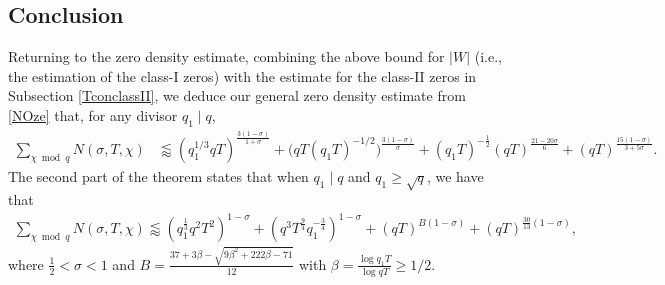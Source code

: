 \documentclass[12pt]{amsart}
\theoremstyle{definition}
\theoremstyle{plain}
\theoremstyle{remark}
\numberwithin{equation}{section}
\numberwithin{theorem}{section}
\numberwithin{equation}{section}
\begin{document}
	\subsection{Conclusion}\label{conclu}
	Returning to the zero density estimate, combining the above bound for $|W|$ (i.e., the estimation of the class-I zeros)
	with the estimate for the class-II zeros in Subsection \ref{TconclassII}, we
	deduce our general zero density estimate from \eqref{NOze} that, for any divisor $q_1\mid q$,
	\begin{align*}
		\sum_{\chi \bmod q} N(\sigma,T,\chi)
		&\lessapprox
		(q_1^{1/3}qT)^{\frac{3(1-\sigma)}{1+\sigma}}
		+
		\bigl(qT(q_1T)^{-1/2}\bigr)^{\frac{3(1-\sigma)}{\sigma}}+
		(q_1T)^{-\frac{1}{2}}(qT)^{\frac{21-20\sigma}{6}}
		+
		(qT)^{\frac{15(1-\sigma)}{3+5\sigma}}.
	\end{align*}
	The second part of the theorem states that when $q_1 \mid q$ and $q_1 \geq \sqrt{q}$, we have that
	\begin{align}
		\sum_{\chi \bmod{q}} N(\sigma,T,\chi) \lessapprox (q_1^{\frac{1}{3}}q^2T^2)^{1-\sigma}+(q^3T^{\frac{9}{4}}q_1^{-\frac{3}{4}})^{1-\sigma}+ (qT)^{B(1-\sigma)} + (qT)^{\frac{30}{13}(1-\sigma)}, \label{Ingham combined ZDE}
	\end{align}
	where $\frac{1}{2} < \sigma < 1$ and $B=\frac{37+3\beta-\sqrt{9\beta^2+222\beta-71}}{12}$ with $\beta = \frac{\log{q_1T}}{\log{qT}} \geq 1/2$.
	
\end{document}
